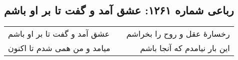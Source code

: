 \begin{center}
\section*{رباعی شماره ۱۲۶۱: عشق آمد و گفت تا بر او باشم}
\label{sec:1261}
\begin{longtable}{l p{0.5cm} r}
عشق آمد و گفت تا بر او باشم
&&
رخسارهٔ عقل و روح را بخراشم
\\
میامد و من همی شدم تا اکنون
&&
این بار نیامدم که آنجا باشم
\\
\end{longtable}
\end{center}
